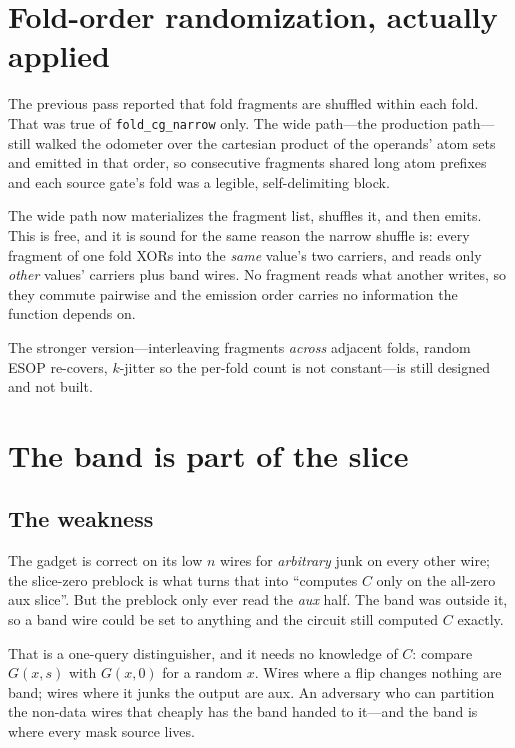 \documentclass[11pt]{article}
\begin{document}
\section{Fold-order randomization, actually applied}

The previous pass reported that fold fragments are shuffled within each fold.
That was true of \texttt{fold\_cg\_narrow} only. The wide path---the production
path---still walked the odometer over the cartesian product of the operands'
atom sets and emitted in that order, so consecutive fragments shared long atom
prefixes and each source gate's fold was a legible, self-delimiting block.

The wide path now materializes the fragment list, shuffles it, and then emits.
This is free, and it is sound for the same reason the narrow shuffle is: every
fragment of one fold XORs into the \emph{same} value's two carriers, and reads
only \emph{other} values' carriers plus band wires. No fragment reads what
another writes, so they commute pairwise and the emission order carries no
information the function depends on.

The stronger version---interleaving fragments \emph{across} adjacent folds,
random ESOP re-covers, $k$-jitter so the per-fold count is not constant---is
still designed and not built.

\section{The band is part of the slice}

\subsection{The weakness}

The gadget is correct on its low $n$ wires for \emph{arbitrary} junk on every
other wire; the slice-zero preblock is what turns that into ``computes $C$ only
on the all-zero aux slice''. But the preblock only ever read the \emph{aux}
half. The band was outside it, so a band wire could be set to anything and the
circuit still computed $C$ exactly.

That is a one-query distinguisher, and it needs no knowledge of $C$: compare
$G(x,s)$ with $G(x,0)$ for a random $x$. Wires where a flip changes nothing are
band; wires where it junks the output are aux. An adversary who can partition
the non-data wires that cheaply has the band handed to it---and the band is
where every mask source lives.
\end{document}
